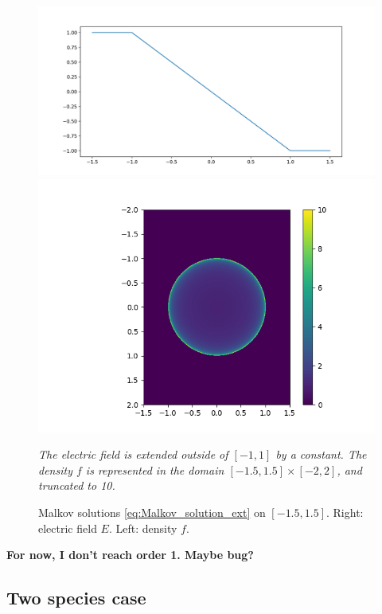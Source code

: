 \documentclass{article}
\numberwithin{equation}{section}
\newcommand{\todo}[1]{{\color{red}\textbf{#1}}}
\newcommand{\mysubcaption}[1]{
	\vspace*{5pt}
	\begin{minipage}{0.8\linewidth}
		\begin{center}
			\footnotesize\emph{#1}
		\end{center}
	\end{minipage}
}
\newcommand{\imh}{\textheight} %
\begin{document}
\begin{figure}
	\centering
	\renewcommand{\imh}{0.33\linewidth}
	\includegraphics[trim = 50 10 55 30, clip, height=\imh]{images/malkov_solution_Ee}
	\includegraphics[trim = 100 10 60 30, clip, height=\imh]{images/malkov_solution_fe}
	\caption{Malkov solutions \cref{eq:Malkov_solution_ext} on $[-1.5,1.5]$. Right: electric field $E$. Left: density $f$.}
	\mysubcaption{The electric field is extended outside of $[-1,1]$ by a constant. The density $f$ is represented in the domain $[-1.5,1.5]\times[-2,2]$, and truncated to 10.}
	\label{fig:malkov_solutions}
\end{figure}

\todo{For now, I don't reach order 1. Maybe bug?}

	
	

\subsection{Two species case} %
\end{document}
